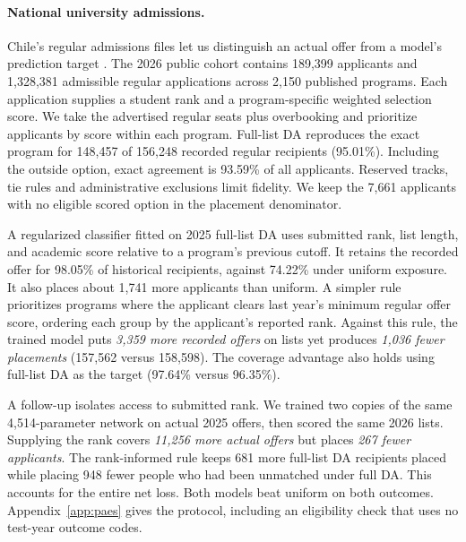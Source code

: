 \paragraph{National university admissions.}
Chile's regular admissions files let us distinguish an actual offer from a model's prediction target \citep{paes,paesrules}. The 2026 public cohort contains 189,399 applicants and 1,328,381 admissible regular applications across 2,150 published programs. Each application supplies a student rank and a program-specific weighted selection score. We take the advertised regular seats plus overbooking and prioritize applicants by score within each program. Full-list DA reproduces the exact program for 148,457 of 156,248 recorded regular recipients (95.01\%). Including the outside option, exact agreement is 93.59\% of all applicants. Reserved tracks, tie rules and administrative exclusions limit fidelity. We keep the 7,661 applicants with no eligible scored option in the placement denominator.

A regularized classifier fitted on 2025 full-list DA uses submitted rank, list length, and academic score relative to a program's previous cutoff. It retains the recorded offer for 98.05\% of historical recipients, against 74.22\% under uniform exposure. It also places about 1,741 more applicants than uniform. A simpler rule prioritizes programs where the applicant clears last year's minimum regular offer score, ordering each group by the applicant's reported rank. Against this rule, the trained model puts \emph{3,359 more recorded offers} on lists yet produces \emph{1,036 fewer placements} (157,562 versus 158,598). The coverage advantage also holds using full-list DA as the target (97.64\% versus 96.35\%).

A follow-up isolates access to submitted rank. We trained two copies of the same 4,514-parameter network on actual 2025 offers, then scored the same 2026 lists. Supplying the rank covers \emph{11,256 more actual offers} but places \emph{267 fewer applicants}. The rank-informed rule keeps 681 more full-list DA recipients placed while placing 948 fewer people who had been unmatched under full DA. This accounts for the entire net loss. Both models beat uniform on both outcomes. Appendix~\ref{app:paes} gives the protocol, including an eligibility check that uses no test-year outcome codes.


